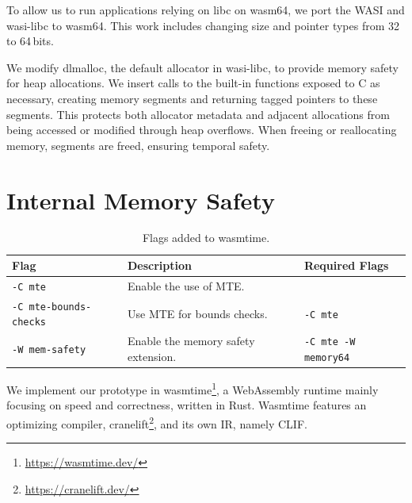 To allow us to run applications relying on libc on wasm64, we port the \acf{WASI} and wasi-libc to wasm64.
This work includes changing size and pointer types from 32 to 64\,bits.

We modify dlmalloc, the default allocator in wasi-libc, to provide memory safety for heap allocations.
We insert calls to the built-in functions exposed to C as necessary, creating memory segments and returning tagged pointers to these segments.
This protects both allocator metadata and adjacent allocations from being accessed or modified through heap overflows.
When freeing or reallocating memory, segments are freed, ensuring temporal safety.


\section{Internal Memory Safety}
\label{sec:internal-memory-safety-impl}

\begin{table}[t]
    \centering
    \caption{Flags added to wasmtime.}
    \label{tab:wasmtime-flags}
    \begin{tabular}{l | l | l}
        \textbf{Flag}                 & \textbf{Description}                & \textbf{Required Flags}     \\
        \hline
        \texttt{-C mte}               & Enable the use of \ac{MTE}.         &                             \\
        \texttt{-C mte-bounds-checks} & Use \ac{MTE} for bounds checks.     & \texttt{-C mte}             \\
        \texttt{-W mem-safety}        & Enable the memory safety extension. & \texttt{-C mte -W memory64} \\
    \end{tabular}
\end{table}

We implement our prototype in wasmtime\footnote{\url{https://wasmtime.dev/}}, a WebAssembly runtime mainly focusing on speed and correctness, written in Rust.
Wasmtime features an optimizing compiler, cranelift\footnote{\url{https://cranelift.dev/}}, and its own \ac{IR}, namely \ac{CLIF}.


